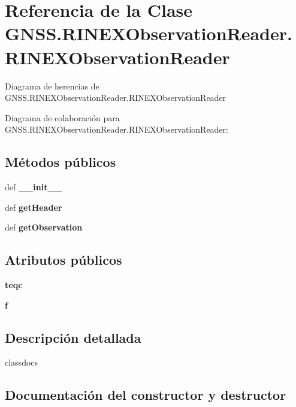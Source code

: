 \section{Referencia de la Clase G\-N\-S\-S.\-R\-I\-N\-E\-X\-Observation\-Reader.\-R\-I\-N\-E\-X\-Observation\-Reader}
\label{classGNSS_1_1RINEXObservationReader_1_1RINEXObservationReader}


Diagrama de herencias de G\-N\-S\-S.\-R\-I\-N\-E\-X\-Observation\-Reader.\-R\-I\-N\-E\-X\-Observation\-Reader


Diagrama de colaboración para G\-N\-S\-S.\-R\-I\-N\-E\-X\-Observation\-Reader.\-R\-I\-N\-E\-X\-Observation\-Reader\-:
\subsection*{Métodos públicos}
\begin{DoxyCompactItemize}
\item 
def {\bf \-\_\-\-\_\-init\-\_\-\-\_\-}
\item 
def {\bf get\-Header}
\item 
def {\bf get\-Observation}
\end{DoxyCompactItemize}
\subsection*{Atributos públicos}
\begin{DoxyCompactItemize}
\item 
{\bf teqc}
\item 
{\bf f}
\end{DoxyCompactItemize}


\subsection{Descripción detallada}
\begin{DoxyVerb}classdocs
\end{DoxyVerb}
 

\subsection{Documentación del constructor y destructor}
